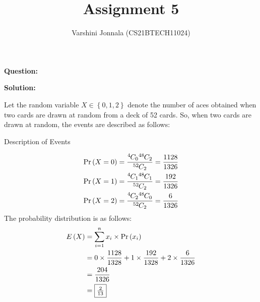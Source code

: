 \documentclass[journal,12pt,twocolumn]{IEEEtran}
\title{Assignment 5}
\author{Varshini Jonnala (CS21BTECH11024)}
\newcommand{\question}{\noindent \textbf{Question: }}
\newcommand{\solution}{\noindent \textbf{Solution: }}
\providecommand{\pr}[1]{\ensuremath{\Pr\left(#1\right)}}
\providecommand{\cbrak}[1]{\ensuremath{\left\{#1\right\}}}
\providecommand{\brak}[1]{\ensuremath{\left(#1\right)}}
\newcommand*{\permcomb}[4][0mu]{{{}^{#3}\mkern#1#2_{#4}}}
\newcommand*{\comb}[1][-1mu]{\permcomb[#1]{C}}
\begin{document}
\maketitle
\question

    
\solution 


 Let the random variable $X \in \cbrak{0,1,2}$ denote the number of aces obtained when two cards are drawn at random from a deck of 52 cards. So, when two cards are drawn at random, the events are described as follows:

    \begin{table}[ht!]
        \centering
        
    	\caption{Description of Events}
    	\label{Tables:Table}
    \end{table}
    
    \begin{align}
        \pr{X = 0} = \frac{\comb{4}{0} \comb{48}{2}}{\comb{52}{2}} = \frac{1128}{1326}\\
         \pr{X = 1} = \frac{\comb{4}{1} \comb{48}{1}}{\comb{52}{2}} = \frac{192}{1326}\\
          \pr{X = 2} = \frac{\comb{4}{2} \comb{48}{0}}{\comb{52}{2}} = \frac{6}{1326}
    \end{align}
    The probability distribution is as follows:
    \begin{align}
    E\brak{X} &= \sum_{i = 1}^{n}x_i \times \pr{x_i}\\
    &= 0 \times \frac{1128}{1328} + 1 \times \frac{192}{1328} + 2\times \frac{6}{1326}\\
    &= \frac{204}{1326}\\
    &= \fbox{$\frac{2}{13}$}
    \end{align}
\end{document}
